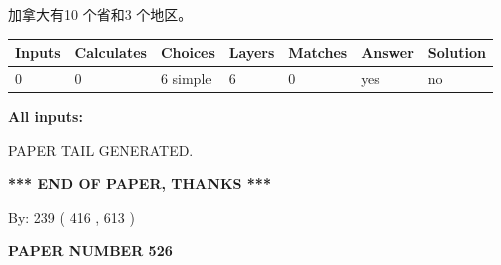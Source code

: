 \documentclass{ctexart}
\begin{document}
 
加拿大有10 个省和3 个地区。
 
 
\noindent{}
 
 
   
   
   
   
\noindent\begin{tabular}{|l|l|l|l|l|l|l|}
 \hline
Inputs & Calculates & Choices & Layers & Matches & Answer & Solution \\ \hline
 0  & 
 0  & 
 6
  simple  
  & 
 6  & 
 0  & 
  yes & 
  no 
  \\ \hline
 \end{tabular}
   
   
   
   
\noindent{}
   
   
   
   
\noindent\vspace{0.1in}\hspace{-0.08in} {\textbf{\Large{All inputs: }}}
   
   
   
   
   
   
 \vspace{0.2in}
 
   
   
\vspace{2.0in} PAPER TAIL GENERATED.
   
   
   
   
\vspace{1.0in} 
{\textbf{\large{ *** END OF PAPER, THANKS *** }}} 
   
   
\hspace{1.0in} By: 
 239 ( 416 ,  613 )
   
   
   
   
\newpage 
\setcounter{page}{ 
   526001 } 
   
   
   
   
 {\textbf{ \Large{ PAPER NUMBER  526  }}}
   
   
\vspace{0.2in}
   
   
   
   
   
   
   
\end{document}
